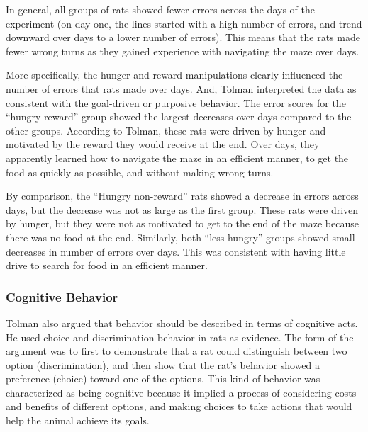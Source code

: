 \documentclass[
  oneside,
  12pt]{crumpbook}
\begin{document}
In general, all groups of rats showed fewer errors across the days of the experiment (on day one, the lines started with a high number of errors, and trend downward over days to a lower number of errors). This means that the rats made fewer wrong turns as they gained experience with navigating the maze over days.

More specifically, the hunger and reward manipulations clearly influenced the number of errors that rats made over days. And, Tolman interpreted the data as consistent with the goal-driven or purposive behavior. The error scores for the ``hungry reward'' group showed the largest decreases over days compared to the other groups. According to Tolman, these rats were driven by hunger and motivated by the reward they would receive at the end. Over days, they apparently learned how to navigate the maze in an efficient manner, to get the food as quickly as possible, and without making wrong turns.

By comparison, the ``Hungry non-reward'' rats showed a decrease in errors across days, but the decrease was not as large as the first group. These rats were driven by hunger, but they were not as motivated to get to the end of the maze because there was no food at the end. Similarly, both ``less hungry'' groups showed small decreases in number of errors over days. This was consistent with having little drive to search for food in an efficient manner.

\hypertarget{cognitive-behavior}{%
\subsubsection{Cognitive Behavior}\label{cognitive-behavior}}

Tolman also argued that behavior should be described in terms of cognitive acts. He used choice and discrimination behavior in rats as evidence. The form of the argument was to first to demonstrate that a rat could distinguish between two option (discrimination), and then show that the rat's behavior showed a preference (choice) toward one of the options. This kind of behavior was characterized as being cognitive because it implied a process of considering costs and benefits of different options, and making choices to take actions that would help the animal achieve its goals.
\end{document}
